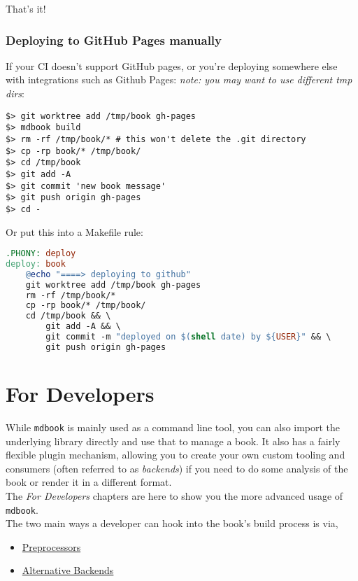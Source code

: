 \documentclass{article}
\begin{document}
That's it!\\

\subsubsection{Deploying to GitHub Pages manually}
\label{Deploying to GitHub Pages manually}
\label{deploying-to-git-hub-pages-manually}

If your CI doesn't support GitHub pages, or you're deploying somewhere else
with integrations such as Github Pages:
\emph{note: you may want to use different tmp dirs}:\\
\begin{lstlisting}[language=console]
$> git worktree add /tmp/book gh-pages
$> mdbook build
$> rm -rf /tmp/book/* # this won't delete the .git directory
$> cp -rp book/* /tmp/book/
$> cd /tmp/book
$> git add -A
$> git commit 'new book message'
$> git push origin gh-pages
$> cd -

\end{lstlisting}

Or put this into a Makefile rule:\\
\begin{lstlisting}[language=makefile]
.PHONY: deploy
deploy: book
	@echo "====> deploying to github"
	git worktree add /tmp/book gh-pages
	rm -rf /tmp/book/*
	cp -rp book/* /tmp/book/
	cd /tmp/book && \
		git add -A && \
		git commit -m "deployed on $(shell date) by ${USER}" && \
		git push origin gh-pages

\end{lstlisting}

\section{For Developers}
\label{For Developers}
\label{for-developers}

While \lstinline|mdbook| is mainly used as a command line tool, you can also import the
underlying library directly and use that to manage a book. It also has a fairly
flexible plugin mechanism, allowing you to create your own custom tooling and
consumers (often referred to as \emph{backends}) if you need to do some analysis of
the book or render it in a different format.\\

The \emph{For Developers} chapters are here to show you the more advanced usage of
\lstinline|mdbook|.\\

The two main ways a developer can hook into the book's build process is via,\\
\begin{itemize}
\item \hyperref[Preprocessors]{Preprocessors}
\item \hyperref[Alternative Backends]{Alternative Backends}
\end{itemize}
\end{document}
